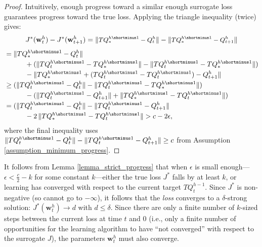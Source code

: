 \documentclass[letterpaper]{article} %
\newcommand{\val}{Q}
\newcommand{\valt}{\val}
\newcommand{\target}{Q}
\newcommand{\params}{\mathbf{w}}
\newcommand{\bellmanop}{T}
\newcommand{\smashednorm}[1]{\left\lVert \smash{#1} \right\rVert}
\begin{document}
\newcommand{\moveback}{}
\begin{proof}
    Intuitively, enough progress toward a similar enough surrogate loss guarantees progress toward the true loss.
    Applying the triangle inequality (twice) gives:
    \begin{equation*}\small
            J^*(\params^h_t) - J^*(\params^h_{t+1}) = \smashednorm{\bellmanop\target^{h\shortminus1}_* - \valt^h_t} - \smashednorm{\bellmanop\target^{h\shortminus1}_* - \valt^h_{t+1}}
    \end{equation*}
    \begin{equation*}
        \begin{split}\small
            &\moveback= \smashednorm{\bellmanop\target^{h\shortminus1}_* - \valt^h_t} \\
            &\moveback\quad\quad\quad + (\smashednorm{\bellmanop\valt^{h\shortminus1}_t - \bellmanop\target^{h\shortminus1}_*} -  \smashednorm{\bellmanop\valt^{h\shortminus1}_t - \bellmanop\target^{h\shortminus1}_*}) \\
            &\moveback\quad\quad\quad
            - \smashednorm{\bellmanop\target^{h\shortminus1}_* + (\bellmanop\valt^{h\shortminus1}_t - \bellmanop\valt^{h\shortminus1}_t) - \valt^h_{t+1}}\\
            &\moveback\geq (\smashednorm{\bellmanop\valt^{h\shortminus1}_t - \valt^h_t} - \smashednorm{\bellmanop\valt^{h\shortminus1}_t - \bellmanop\target^{h\shortminus1}_*})\\
            &\moveback\quad\quad\quad - (\smashednorm{\bellmanop\valt^{h\shortminus1}_t - \valt^h_{t+1}}+\smashednorm{\bellmanop\target^{h\shortminus1}_*- \bellmanop\valt^{h\shortminus1}_t })\\
            &\moveback= (\smashednorm{\bellmanop\valt^{h\shortminus1}_t - \valt^h_t} -\smashednorm{\bellmanop\valt^{h\shortminus1}_t - \valt^h_{t+1} }\\
            &\moveback\quad\quad\quad - 2\smashednorm{\bellmanop\target^{h\shortminus1}_* -  \bellmanop\valt^{h\shortminus1}_t }
        > c - 2\epsilon,\\
    \end{split}
    \end{equation*}
    where the final inequality uses $ \smashednorm{\bellmanop\valt^{h\shortminus1}_t - \valt^h_t} - \smashednorm{\bellmanop\valt^{h\shortminus1}_t - \valt^h_{t+1}} \geq c$ from
    Assumption \ref{assumption_minimum_progress}.
\end{proof}

It follows from Lemma \ref{lemma_strict_progress} that when $\epsilon$ is small enough---$\epsilon < \frac{c}{2} - k$ for some constant $k$---either the true loss $J^*$ falls by at least $k$, or learning has converged with respect to the current target $\bellmanop\valt^{h-1}_t$. Since $J^*$ is non-negative (so cannot go to $-\infty$), it follows that the \textit{loss} converges to a $\delta$-strong solution: $J^*(\params^h_t) \to d$ with $d \leq \delta$. Since there are only a finite number of $k$-sized steps between the current loss at time $t$ and $0$ (i.e., only a finite number of opportunities for the learning algorithm to have ``not converged'' with respect to the surrogate $J$), the parameters $\params^h_t$ must also converge.
\end{document}
